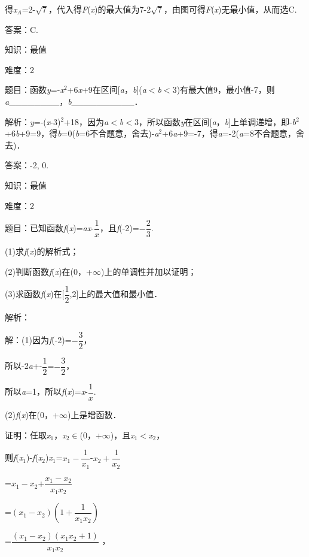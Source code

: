 \documentclass{article} %
\begin{document}
得\textit{x${}_{A}$}=2-$\sqrt{7}$，代入得\textit{F}(\textit{x})的最大值为7-2$\sqrt{7}$，由图可得\textit{F}(\textit{x})无最小值，从而选C.

答案：C.

知识：最值

难度：2

题目：函数\textit{y}=-\textit{x}${}^{2}$+6\textit{x}+9在区间[\textit{a}，\textit{b}](\textit{a}$\mathrm{<}$\textit{b}$\mathrm{<}$3)有最大值9，最小值-7，则\textit{a}\_\_\_\_\_\_\_\_，\textit{b}\_\_\_\_\_\_\_\_\_\_．

解析：\textit{y}=-(\textit{x}-3)${}^{2}$+18，因为\textit{a}$\mathrm{<}$\textit{b}$\mathrm{<}$3，所以函数\textit{y}在区间[\textit{a}，\textit{b}]上单调递增，即-\textit{b}${}^{2}$+6\textit{b}+9=9，得\textit{b}=0(\textit{b}=6不合题意，舍去)-\textit{a}${}^{2}$+6\textit{a}+9=-7，得\textit{a}=-2(\textit{a}=8不合题意，舍去)．

答案：-2, 0.

知识：最值

难度：2

题目：已知函数\textit{f}(\textit{x})=\textit{ax}-$\dfrac{1}{x}$，且\textit{f}(-2)=$-\dfrac{2}{3}$.

(1)求\textit{f}(\textit{x})的解析式；

(2)判断函数\textit{f}(\textit{x})在(0，+$\mathrm{\infty}$)上的单调性并加以证明；

(3)求函数\textit{f}(\textit{x})在[$\dfrac{1}{2}$,2]上的最大值和最小值．

解析：

解：(1)因为\textit{f}(-2)=$-\dfrac{3}{2}$，

所以-2\textit{a}+-$\dfrac{1}{2}$=$-\dfrac{3}{2}$，

所以\textit{a}=1，所以\textit{f}(\textit{x})=\textit{x}-$\dfrac{1}{x}$.

(2)\textit{f}(\textit{x})在(0，+$\mathrm{\infty}$)上是增函数．

证明：任取\textit{x}${}_{1}$，\textit{x}${}_{2}$$\mathrm{\in}$(0，+$\mathrm{\infty}$)，且\textit{x}${}_{1}$$\mathrm{<}$\textit{x}${}_{2}$，

则\textit{f}(\textit{x}${}_{1}$)-\textit{f}(\textit{x}${}_{2}$)\textit{x}${}_{1}$=$x_{1}-\dfrac{1}{x_{1}}$-$x_{2}+\dfrac{1}{x_{2}}$


=$x_{1}-x_{2}$+$\dfrac{x_{1}-x_{2}}{x_{1}x_{2}}$

=$(x_{1}-x_{2})$$(1+\dfrac{1}{x_{1}x_{2}})$

=$\dfrac{(x_{1}-x_{2})(x_{1}x_{2}+1)}{x_{1}x_{2}}$
，
\end{document}
